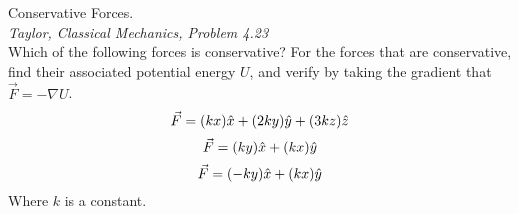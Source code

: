 \documentclass[11pt]{article}
\theoremstyle{gangnamstyle}{\newtheorem{definition}{Definition}[]}
\theoremstyle{gangnamstyle}{\newtheorem{example}{Example}[]}
\theoremstyle{gangnamstyle}{\newtheorem{problem}{Problem}[]}
\begin{document}
\begin{problem}
Conservative Forces. \\
\textit{Taylor, Classical Mechanics, Problem 4.23} \\
Which of the following forces is conservative? For the forces that are conservative, find their associated potential energy $U$, and verify by taking the gradient that $\Vec{F} = - \nabla U$. \\
\[ \Vec{F} = (kx)\Hat{x} + (2ky)\Hat{y} + (3kz)\Hat{z} \]
\[ \Vec{F} = (ky)\Hat{x} + (kx)\Hat{y} \]
\[ \Vec{F} = (-ky)\Hat{x} + (kx)\Hat{y} \]
Where $k$ is a constant. 
\end{problem}
\end{document}
